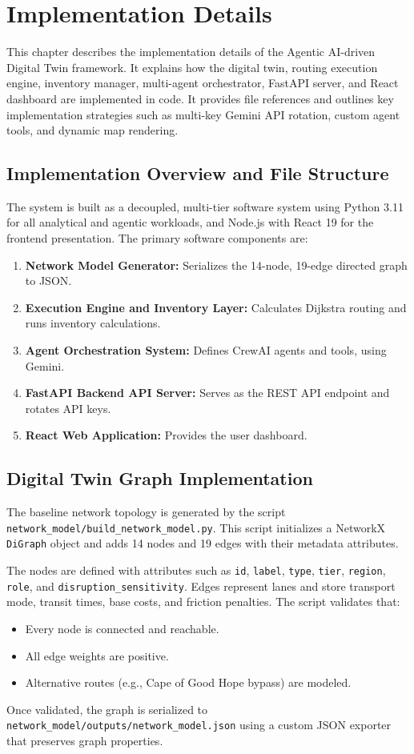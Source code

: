 \chapter{Implementation Details}

This chapter describes the implementation details of the Agentic AI-driven Digital Twin framework. It explains how the digital twin, routing execution engine, inventory manager, multi-agent orchestrator, FastAPI server, and React dashboard are implemented in code. It provides file references and outlines key implementation strategies such as multi-key Gemini API rotation, custom agent tools, and dynamic map rendering.

\section{Implementation Overview and File Structure}
The system is built as a decoupled, multi-tier software system using Python 3.11 for all analytical and agentic workloads, and Node.js with React 19 for the frontend presentation. The primary software components are:
\begin{enumerate}
    \item \textbf{Network Model Generator:} Serializes the 14-node, 19-edge directed graph to JSON.
    \item \textbf{Execution Engine and Inventory Layer:} Calculates Dijkstra routing and runs inventory calculations.
    \item \textbf{Agent Orchestration System:} Defines CrewAI agents and tools, using Gemini.
    \item \textbf{FastAPI Backend API Server:} Serves as the REST API endpoint and rotates API keys.
    \item \textbf{React Web Application:} Provides the user dashboard.
\end{enumerate}

\section{Digital Twin Graph Implementation}
The baseline network topology is generated by the script \texttt{network\_model/build\_network\_model.py}. This script initializes a NetworkX \texttt{DiGraph} object and adds 14 nodes and 19 edges with their metadata attributes.

The nodes are defined with attributes such as \texttt{id}, \texttt{label}, \texttt{type}, \texttt{tier}, \texttt{region}, \texttt{role}, and \texttt{disruption\_sensitivity}. Edges represent lanes and store transport mode, transit times, base costs, and friction penalties. The script validates that:
\begin{itemize}
    \item Every node is connected and reachable.
    \item All edge weights are positive.
    \item Alternative routes (e.g., Cape of Good Hope bypass) are modeled.
\end{itemize}
Once validated, the graph is serialized to \texttt{network\_model/outputs/network\_model.json} using a custom JSON exporter that preserves graph properties.


